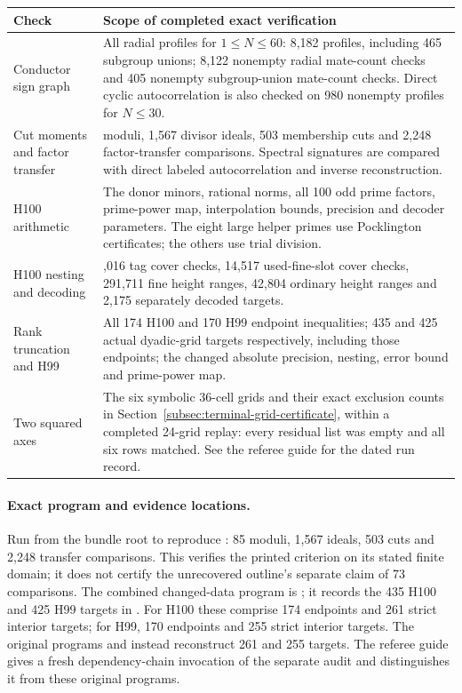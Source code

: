 \documentclass[11pt]{article}
\numberwithin{equation}{section}
\theoremstyle{definition}
\theoremstyle{remark}
\begin{document}
\begin{center}\small
\begin{tabular}{@{}>{\raggedright\arraybackslash}p{.27\linewidth}>{\raggedright\arraybackslash}p{.64\linewidth}@{}}\toprule
Check & Scope of completed exact verification\\\midrule
Conductor sign graph &
All radial profiles for $1\le N\le60$: 8,182 profiles, including
465 subgroup unions; 8,122 nonempty radial mate-count checks and
405 nonempty subgroup-union mate-count checks. Direct cyclic
autocorrelation is also checked on 980 nonempty profiles for $N\le30$.\\
Cut moments and factor transfer &
85 moduli, 1,567 divisor ideals, 503 membership cuts and 2,248
factor-transfer comparisons. Spectral signatures are compared with
direct labeled autocorrelation and inverse reconstruction.\\
H100 arithmetic &
The donor minors, rational norms, all 100 odd prime factors, prime-power
map, interpolation bounds, precision and decoder parameters. The eight
large helper primes use Pocklington certificates; the others use trial
division.\\
H100 nesting and decoding &
902,016 tag cover checks, 14,517 used-fine-slot cover checks,
291,711 fine height ranges, 42,804 ordinary height ranges and 2,175
separately decoded targets.\\
Rank truncation and H99 &
All 174 H100 and 170 H99 endpoint inequalities; 435 and 425
actual dyadic-grid targets respectively, including those endpoints;
the changed absolute precision,
nesting, error bound and prime-power map.\\
Two squared axes &
The six symbolic 36-cell grids and their exact exclusion counts in
Section~\ref{subsec:terminal-grid-certificate}, within a completed 24-grid replay: every residual list was empty and
all six rows matched. See the referee guide for the dated run record.\\\bottomrule
\end{tabular}
\end{center}

\paragraph{Exact program and evidence locations.}
Run  from the bundle
root to reproduce : 85 moduli,
1,567 ideals, 503 cuts and 2,248 transfer comparisons. This verifies the
printed criterion on its stated finite domain; it does not certify the
unrecovered outline's separate claim of 73 comparisons.
The combined changed-data program is
; it records the 435 H100
and 425 H99 targets in .
For H100 these comprise 174 endpoints and 261 strict interior targets;
for H99, 170 endpoints and 255 strict interior targets. The original
programs  and
 instead reconstruct 261 and
255 targets. The referee guide gives a fresh dependency-chain invocation
of the separate audit and distinguishes it from these original programs.
\end{document}
